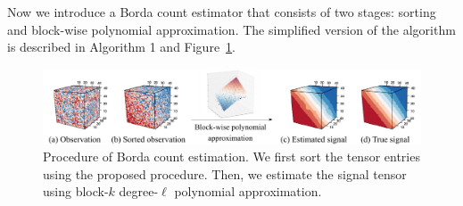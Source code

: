 \documentclass{article}
\newtheorem{lem}{Lemma}
\theoremstyle{definition}
\begin{document}



Now we introduce a Borda count estimator that consists of two stages: sorting and block-wise polynomial approximation. The simplified version of the algorithm is described in Algorithm 1 and Figure~\ref{fig:borda}. 
\begin{figure}[H]
    \centering
    \includegraphics[width = .8\textwidth]{figures/Borda2.pdf}
    \caption{Procedure of Borda count estimation. We first sort the tensor entries using the proposed procedure. Then, we estimate the signal tensor using block-$k$ degree-$\ell$ polynomial approximation.}
    \label{fig:borda}
    \vspace{-.6 cm}
\end{figure}
\end{document}
